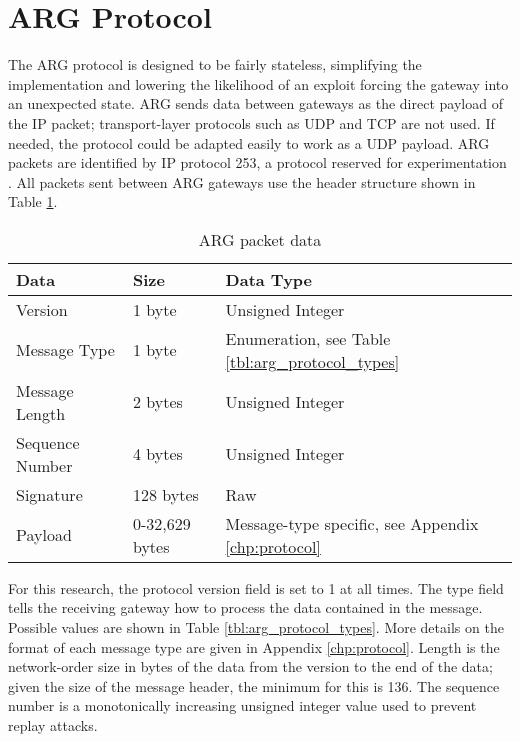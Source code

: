 \section{\ac{ARG} Protocol}
\label{sec:arg_protocol}
\par The \ac{ARG} protocol is designed to be fairly stateless, simplifying the implementation and lowering the likelihood of an exploit forcing the gateway into an unexpected state. \ac{ARG} sends data between gateways as the direct payload of the \ac{IP} packet; transport-layer protocols such as \ac{UDP} and \ac{TCP} are not used. If needed, the protocol could be adapted easily to work as a \ac{UDP} payload. \ac{ARG} packets are identified by \ac{IP} protocol 253, a protocol reserved for experimentation \cite{rfc3692}. All packets sent between \ac{ARG} gateways use the header structure shown in Table \ref{tab:arg_packet_structure}.

\begin{table}
\caption{\ac{ARG} packet data}
\label{tab:arg_packet_structure}
\centering
\begin{tabular}{lll}
\toprule
\textbf{Data} & \textbf{Size} & \textbf{Data Type}\\
\hline
Version & 1 byte & Unsigned Integer\\
Message Type & 1 byte & Enumeration, see Table \ref{tbl:arg_protocol_types}\\
Message Length & 2 bytes & Unsigned Integer\\
Sequence Number & 4 bytes & Unsigned Integer\\
Signature & 128 bytes & Raw\\
Payload & 0-32,629 bytes & Message-type specific, see Appendix \ref{chp:protocol}\\
\bottomrule
\end{tabular}
\end{table}

\par For this research, the protocol version field is set to 1 at all times. The type field tells the receiving gateway how to process the data contained in the message. Possible values are shown in Table \ref{tbl:arg_protocol_types}. More details on the format of each message type are given in Appendix \ref{chp:protocol}. Length is the network-order size in bytes of the data from the version to the end of the data; given the size of the message header, the minimum for this is 136. The sequence number is a monotonically increasing unsigned integer value used to prevent replay attacks.

